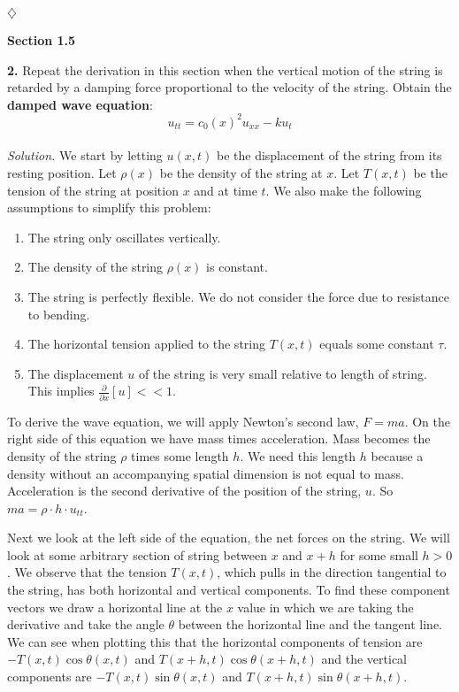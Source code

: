 \documentclass{article}
\begin{document}
\begin{flushright}
\( \diamondsuit \) 
\end{flushright}

\newpage
\noindent
\textbf{Section 1.5} 

\noindent
\textbf{2.} Repeat the derivation in this section when the vertical motion of the string is retarded by a damping force proportional to the velocity of the string. Obtain the \textbf{damped wave equation}:
\[
u_{tt} = c_0(x)^2 u_{xx} -ku_t
\]
\vspace{2mm}
\\ 
\noindent
\textit{Solution.} We start by letting \(u(x,t) \) be the displacement of the string from its resting position. Let \(\rho(x)\) be the density of the string at \(x\). Let \(T(x,t)\) be the tension of the string at position \(x\) and at time \(t\). We also make the following assumptions to simplify this problem:

\begin{enumerate}
\item The string only oscillates vertically.  
\item The density of the string \(\rho(x) \) is constant. 
\item The string is perfectly flexible. We do not consider the force due to resistance to bending.
\item The horizontal tension applied to the string \(T(x,t)\) equals some constant \( \tau\). 
\item The displacement \(u\) of the string is very small relative to length of string. This implies \(\frac{\partial}{\partial x} [u] << 1\). 
\end{enumerate}

\noindent
To derive the wave equation, we will apply Newton's second law, \( F=ma\). On the right side of this equation we have mass times acceleration. Mass becomes the density of the string \(\rho\) times some length \(h\). We need this length \(h\) because a density without an accompanying spatial dimension is not equal to mass. Acceleration is the second derivative of the position of the string, \(u\). So \(ma = \rho \cdot h \cdot u_{tt} \).  

\vspace{3mm}
\noindent
Next we look at the left side of the equation, the net forces on the string. We will look at some arbitrary section of string between \(x\) and \(x+h\) for some small \(h>0\). We observe that the tension \(T(x,t)\), which pulls in the direction tangential to the string, has both horizontal and vertical components. To find these component vectors we draw a horizontal line at the \(x\) value in which we are taking the derivative and take the angle \(\theta\) between the horizontal line and the tangent line.  We can see when plotting this that the horizontal components of tension are \( -T(x,t)\cos \theta(x,t) \) and \( T(x+h,t)\cos \theta(x+h,t) \) and the vertical components are \( -T(x,t)\sin \theta(x,t) \) and \( T(x+h,t)\sin \theta(x+h,t) \).
\end{document}
